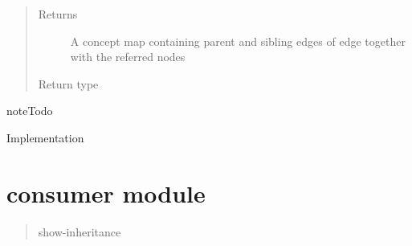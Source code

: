 \documentclass[letterpaper,10pt,english]{sphinxmanual}
\begin{document}
\begin{fulllineitems}
\begin{fulllineitems}
\begin{quote}
\begin{description}
\item[{Returns}] \leavevmode
A concept map containing parent and sibling edges of edge together with the referred nodes

\item[{Return type}] \leavevmode
{\hyperref[\detokenize{concept_map:concept_map.ConceptMap}]{}}

\end{description}\end{quote}

\begin{sphinxadmonition}{note}{Todo}

Implementation
\end{sphinxadmonition}

\end{fulllineitems}


\end{fulllineitems}



\chapter{consumer module}
\label{\detokenize{consumer:consumer-module}}\label{\detokenize{consumer:concept-map-module}}\label{\detokenize{consumer:module-concept_map}}\label{\detokenize{consumer::doc}}\label{\detokenize{consumer:module-consumer}}\begin{quote}\begin{description}
\item[{show-inheritance}] \leavevmode
\end{description}\end{quote}
\end{document}
